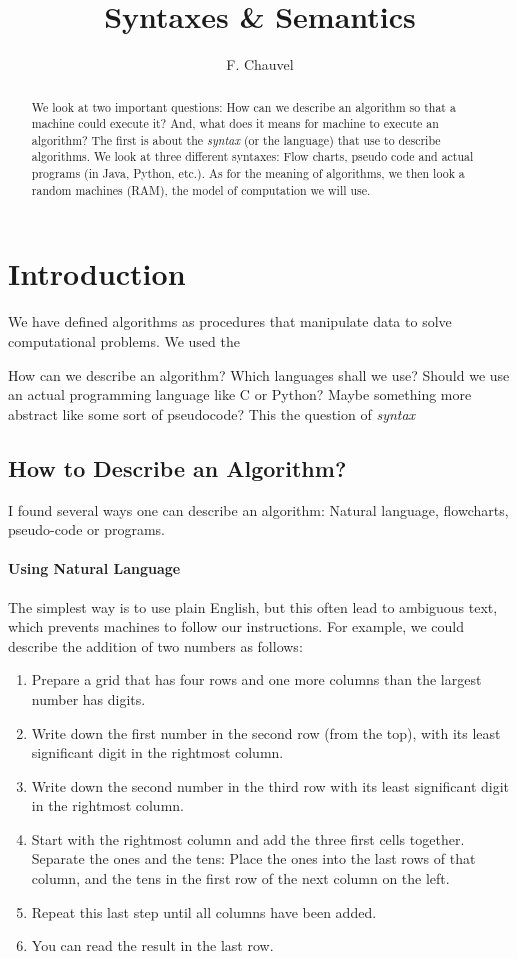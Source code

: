 \documentclass {aldast}
\title{Syntaxes \& Semantics}
\author{F. Chauvel}
\begin{document}
\maketitle

\begin{abstract}
  We look at two important questions: How can we describe an algorithm
  so that a machine could execute it? And, what does it means for
  machine to execute an algorithm?  The first is about the
  \emph{syntax} (or the language) that use to describe algorithms. We
  look at three different syntaxes: Flow charts, pseudo code and
  actual programs (in Java, Python, etc.). As for the meaning of
  algorithms, we then look a random machines (RAM), the model of
  computation we will use.
\end{abstract}


\section*{Introduction}
We have defined algorithms as procedures that manipulate data to solve
computational problems. We used the

How can we describe an algorithm? Which
languages shall we use? Should we use an actual programming language
like C or Python? Maybe something more abstract like some sort of
pseudocode? This the question of \emph{syntax}


\subsection{How to Describe an Algorithm?}

I found several ways one can describe an algorithm: Natural language,
flowcharts, pseudo-code or programs.

\paragraph{Using Natural Language} The simplest way is to use plain
English, but this often lead to ambiguous text, which prevents
machines to follow our instructions. For example, we could describe
the addition of two numbers as follows:
\begin{enumerate}
\item Prepare a grid that has four rows and one more columns than the
  largest number has digits.
\item Write down the first number in the second row (from the top),
  with its least significant digit in the rightmost column.
\item Write down the second number in the third row with its least
  significant digit in the rightmost column.
\item Start with the rightmost column and add the three first cells
  together. Separate the ones and the tens: Place the ones into the
  last rows of that column, and the tens in the first row of the next
  column on the left.
\item Repeat this last step until all columns have been added.
\item You can read the result in the last row.
\end{enumerate}
\end{document}
